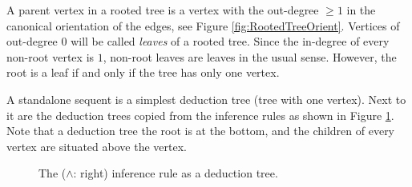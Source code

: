 

\setcounter{section}{2}
\setcounter{subsection}{5}
\setcounter{dfn}{13}

A parent vertex in a rooted tree is a vertex with the out-degree $\ge 1$ in the canonical orientation of the edges, see Figure \ref{fig:RootedTreeOrient}.
Vertices of out-degree $0$ will be called \emph{leaves} of a rooted tree.
Since the in-degree of every non-root vertex is $1$, non-root leaves are leaves in the usual sense.
However, the root is a leaf if and only if the tree has only one vertex.

A standalone sequent is a simplest deduction tree (tree with one vertex).
Next to it are the deduction trees copied from the inference rules as shown in Figure \ref{fig:DeductionTree}.
Note that a deduction tree the root is at the bottom, and the children of every vertex are situated above the vertex.

\begin{figure}[ht]
\begin{center}
\hspace{1cm}

\end{center}
\caption{The ($\wedge$: right) inference rule as a deduction tree.}
\label{fig:DeductionTree}
\end{figure}


